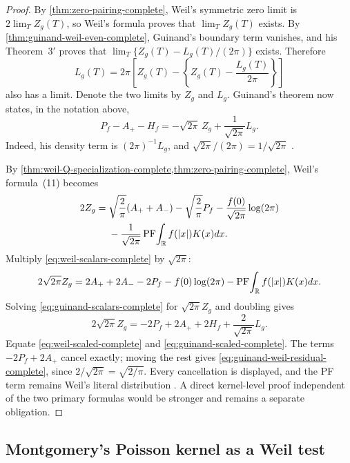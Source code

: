 \begin{proof}
By \cref{thm:zero-pairing-complete}, Weil's symmetric zero limit is
$2\lim_T Z_g(T)$, so Weil's formula proves that $\lim_T Z_g(T)$ exists.
By \cref{thm:guinand-weil-even-complete}, Guinand's boundary term vanishes,
and his Theorem~$3'$ proves that
$\lim_T\{Z_g(T)-L_g(T)/(2\pi)\}$ exists.  Therefore
\[
 L_g(T)=2\pi\left[Z_g(T)-
 \left\{Z_g(T)-\frac{L_g(T)}{2\pi}\right\}\right]
\]
also has a limit.  Denote the two limits by $Z_g$ and $L_g$.
Guinand's theorem now states, in the notation above,
\begin{equation}
 P_f-A_+-H_f
 =-\sqrt{2\pi}\,Z_g+\frac1{\sqrt{2\pi}}L_g.
 \label{eq:guinand-scalars-complete}
\end{equation}
Indeed, his density term is $(2\pi)^{-1}L_g$, and
$\sqrt{2\pi}/(2\pi)=1/\sqrt{2\pi}$
\cite[pp.~114--115, Thms.~3 and~$3'$]{guinand1948}.

By \cref{thm:weil-Q-specialization-complete,thm:zero-pairing-complete}, Weil's
formula~(11) becomes
\begin{align}
 2Z_g={}&\sqrt{\frac2\pi}(A_++A_-)
 -\sqrt{\frac2\pi}P_f
 -\frac{f(0)}{\sqrt{2\pi}}\log(2\pi)\notag\\
 &-\frac1{\sqrt{2\pi}}
 \operatorname{PF}\!\int_\mathbb R f(|x|)K(x)dx.
 \label{eq:weil-scalars-complete}
\end{align}
Multiply \eqref{eq:weil-scalars-complete} by $\sqrt{2\pi}$:
\begin{equation}
 2\sqrt{2\pi}Z_g
 =2A_++2A_--2P_f-f(0)\log(2\pi)
 -\operatorname{PF}\!\int_\mathbb R f(|x|)K(x)dx.
 \label{eq:weil-scaled-complete}
\end{equation}
Solving \eqref{eq:guinand-scalars-complete} for $\sqrt{2\pi}Z_g$ and doubling
gives
\begin{equation}
 2\sqrt{2\pi}Z_g
 =-2P_f+2A_++2H_f+\frac{2}{\sqrt{2\pi}}L_g.
 \label{eq:guinand-scaled-complete}
\end{equation}
Equate \eqref{eq:weil-scaled-complete} and
\eqref{eq:guinand-scaled-complete}.  The terms $-2P_f+2A_+$ cancel exactly;
moving the rest gives \eqref{eq:guinand-weil-residual-complete}, since
$2/\sqrt{2\pi}=\sqrt{2/\pi}$.  Every cancellation is displayed, and the PF
term remains Weil's literal distribution
\cite[Collected Papers II, pp.~56--58]{weil1952}.  A direct kernel-level proof
independent of the two primary formulas would be stronger and remains a
separate obligation.
\end{proof}

\subsection{Montgomery's Poisson kernel as a Weil test}

